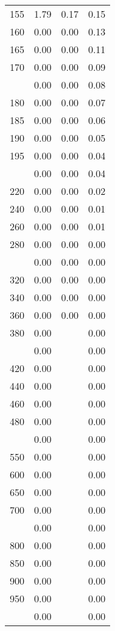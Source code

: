 \begin{table}[ht]
\begin{tabular}{lccc}
  155 & 1.79 & 0.17 & 0.15 \\ 
  160 & 0.00 & 0.00 & 0.13 \\ 
  165 & 0.00 & 0.00 & 0.11 \\ 
  170 & 0.00 & 0.00 & 0.09 \\ 
   \addlinespace
175 & 0.00 & 0.00 & 0.08 \\ 
  180 & 0.00 & 0.00 & 0.07 \\ 
  185 & 0.00 & 0.00 & 0.06 \\ 
  190 & 0.00 & 0.00 & 0.05 \\ 
  195 & 0.00 & 0.00 & 0.04 \\ 
   \addlinespace
200 & 0.00 & 0.00 & 0.04 \\ 
  220 & 0.00 & 0.00 & 0.02 \\ 
  240 & 0.00 & 0.00 & 0.01 \\ 
  260 & 0.00 & 0.00 & 0.01 \\ 
  280 & 0.00 & 0.00 & 0.00 \\ 
   \addlinespace
300 & 0.00 & 0.00 & 0.00 \\ 
  320 & 0.00 & 0.00 & 0.00 \\ 
  340 & 0.00 & 0.00 & 0.00 \\ 
  360 & 0.00 & 0.00 & 0.00 \\ 
  380 & 0.00 &  & 0.00 \\ 
   \addlinespace
400 & 0.00 &  & 0.00 \\ 
  420 & 0.00 &  & 0.00 \\ 
  440 & 0.00 &  & 0.00 \\ 
  460 & 0.00 &  & 0.00 \\ 
  480 & 0.00 &  & 0.00 \\ 
   \addlinespace
500 & 0.00 &  & 0.00 \\ 
  550 & 0.00 &  & 0.00 \\ 
  600 & 0.00 &  & 0.00 \\ 
  650 & 0.00 &  & 0.00 \\ 
  700 & 0.00 &  & 0.00 \\ 
   \addlinespace
750 & 0.00 &  & 0.00 \\ 
  800 & 0.00 &  & 0.00 \\ 
  850 & 0.00 &  & 0.00 \\ 
  900 & 0.00 &  & 0.00 \\ 
  950 & 0.00 &  & 0.00 \\ 
   \addlinespace
1000 & 0.00 &  & 0.00 \\ 
   \bottomrule
\end{tabular}
\end{table}
